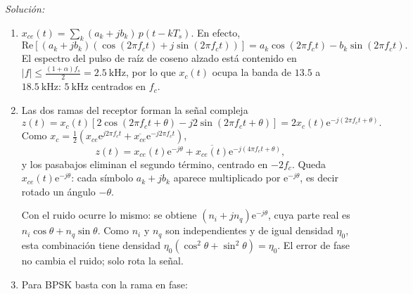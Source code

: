 \documentclass[a4paper,11pt]{article}
\newcommand{\e}{\mathrm{e}}
\newenvironment{solucion}[1][]{
\noindent \large \textsl{Solución:} \ifthenelse{\equal{#1}{}}{}{\emph{(#1)}}

\smallskip
}{
\bigskip
}
\begin{document}
\begin{solucion}
\begin{enumerate}
\item $x_{ce}(t)=\sum_k(a_k+jb_k)\,p(t-kT_s)$. En efecto,
\begin{equation*}
\mathrm{Re}\left[(a_k+jb_k)\left(\cos(2\pi f_ct)+j\sin(2\pi f_ct)\right)\right]=a_k\cos(2\pi f_ct)-b_k\sin(2\pi f_ct).
\end{equation*}
El espectro del pulso de raíz de coseno alzado está contenido en $|f|\leqslant\frac{(1+\alpha)f_s}{2}=2.5\ \unit{\kilo\hertz}$, por lo que $x_c(t)$ ocupa la banda de $13.5$ a $18.5\ \unit{\kilo\hertz}$: $5\ \unit{\kilo\hertz}$ centrados en $f_c$.

\item Las dos ramas del receptor forman la señal compleja
\begin{equation*}
z(t)=x_c(t)\left[2\cos(2\pi f_ct+\theta)-j2\sin(2\pi f_ct+\theta)\right]=2x_c(t)\e^{-j(2\pi f_ct+\theta)}.
\end{equation*}
Como $x_c=\frac12\left(x_{ce}\e^{j2\pi f_ct}+\overline{x_{ce}}\e^{-j2\pi f_ct}\right)$,
\begin{equation*}
z(t)=x_{ce}(t)\e^{-j\theta}+\overline{x_{ce}(t)}\e^{-j(4\pi f_ct+\theta)},
\end{equation*}
y los pasabajos eliminan el segundo término, centrado en $-2f_c$. Queda $x_{ce}(t)\e^{-j\theta}$: cada símbolo $a_k+jb_k$ aparece multiplicado por $\e^{-j\theta}$, es decir rotado un ángulo $-\theta$.

Con el ruido ocurre lo mismo: se obtiene $(n_i+jn_q)\e^{-j\theta}$, cuya parte real es $n_i\cos\theta+n_q\sin\theta$. Como $n_i$ y $n_q$ son independientes y de igual densidad $\eta_0$, esta combinación tiene densidad $\eta_0(\cos^2\theta+\sin^2\theta)=\eta_0$. El error de fase no cambia el ruido; solo rota la señal.

\item Para BPSK basta con la rama en fase:


\end{enumerate}
\end{solucion}
\end{document}
